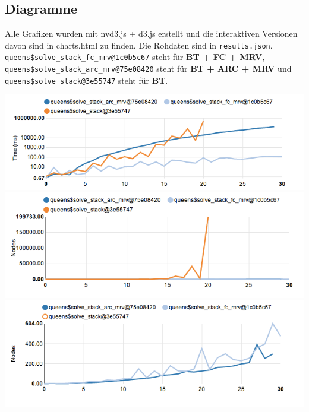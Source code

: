 \documentclass[a4paper,10pt]{article}
\begin{document}
\subsection*{Diagramme}
Alle Grafiken wurden mit nvd3.js + d3.js erstellt und die interaktiven Versionen davon sind in charts.html zu finden. Die Rohdaten sind in \texttt{results.json}. \texttt{queens\$solve\_stack\_fc\_mrv@1c0b5c67} steht für \textbf{BT + FC + MRV}, \texttt{queens\$solve\_stack\_arc\_mrv@75e08420} steht für \textbf{BT + ARC + MRV} und \texttt{queens\$solve\_stack@3e55747} steht für \textbf{BT}.
\begin{center}
\includegraphics[scale=0.7]{chart_one.png} \\
\includegraphics[scale=0.7]{chart_two.png} \\
\includegraphics[scale=0.7]{chart_three.png} \\
\end{center}
\end{document}
